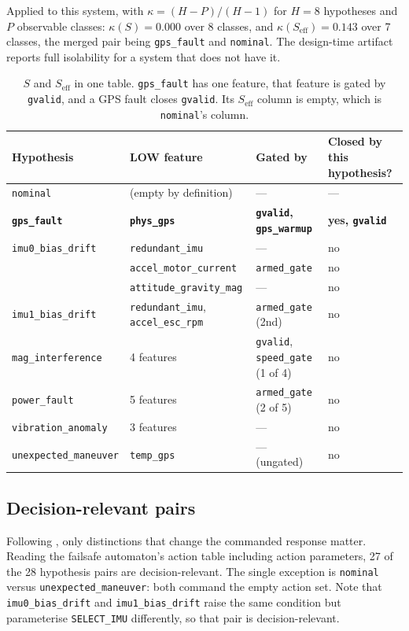 \documentclass[11pt,a4paper]{article}
\newcommand{\code}[1]{\texttt{\small #1}}
\begin{document}
Applied to this system, with $\kappa = (H-P)/(H-1)$ for $H=8$ hypotheses and
$P$ observable classes:
$\kappa(S) = 0.000$ over 8 classes, and
$\kappa(S_{\mathrm{eff}}) = 0.143$ over 7 classes, the merged pair being
\code{gps\_fault} and \code{nominal}. The design-time artifact reports full
isolability for a system that does not have it.

\begin{table}[h]
\centering
\small
\begin{tabular}{llll}
\toprule
Hypothesis & LOW feature & Gated by & Closed by this hypothesis? \\
\midrule
\code{nominal} & (empty by definition) & --- & --- \\
\textbf{\code{gps\_fault}} & \textbf{\code{phys\_gps}} &
  \textbf{\code{gvalid}, \code{gps\_warmup}} & \textbf{yes, \code{gvalid}} \\
\code{imu0\_bias\_drift} & \code{redundant\_imu} & --- & no \\
 & \code{accel\_motor\_current} & \code{armed\_gate} & no \\
 & \code{attitude\_gravity\_mag} & --- & no \\
\code{imu1\_bias\_drift} & \code{redundant\_imu}, \code{accel\_esc\_rpm} &
  \code{armed\_gate} (2nd) & no \\
\code{mag\_interference} & 4 features & \code{gvalid}, \code{speed\_gate}
  (1 of 4) & no \\
\code{power\_fault} & 5 features & \code{armed\_gate} (2 of 5) & no \\
\code{vibration\_anomaly} & 3 features & --- & no \\
\code{unexpected\_maneuver} & \code{temp\_gps} & --- (ungated) & no \\
\bottomrule
\end{tabular}
\caption{$S$ and $S_{\mathrm{eff}}$ in one table. \code{gps\_fault} has one
feature, that feature is gated by \code{gvalid}, and a GPS fault closes
\code{gvalid}. Its $S_{\mathrm{eff}}$ column is empty, which is
\code{nominal}'s column.}
\label{tab:signatures}
\end{table}

\subsection{Decision-relevant pairs}

Following \cite{blanke2003ftc}, only distinctions that change the commanded
response matter. Reading the failsafe automaton's action table including action
parameters, 27 of the 28 hypothesis pairs are decision-relevant. The single
exception is \code{nominal} versus \code{unexpected\_maneuver}: both command
the empty action set. Note that \code{imu0\_bias\_drift} and
\code{imu1\_bias\_drift} raise the same condition but parameterise
\code{SELECT\_IMU} differently, so that pair is decision-relevant.
\end{document}
